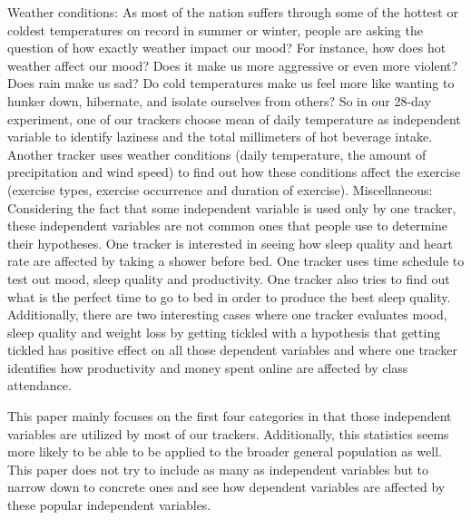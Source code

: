 Weather conditions:
As most of the nation suffers through some of the hottest or coldest temperatures on record in summer or winter, people are asking the question of how exactly weather impact our mood? For instance, how does hot weather affect our mood? Does it make us more aggressive or even more violent? Does rain make us sad? Do cold temperatures make us feel more like wanting to hunker down, hibernate, and isolate ourselves from others? So in our 28-day experiment, one of our trackers choose mean of daily temperature as independent variable to identify laziness and the total millimeters of hot beverage intake. Another tracker uses weather conditions (daily temperature, the amount of precipitation and wind speed) to find out how these conditions affect the exercise (exercise types, exercise occurrence and duration of exercise).
Miscellaneous:
Considering the fact that some independent variable is used only by one tracker, these independent variables are not common ones that people use to determine their hypotheses. One tracker is interested in seeing how sleep quality and heart rate are affected by taking a shower before bed. One tracker uses time schedule to test out mood, sleep quality and productivity. One tracker also tries to find out what is the perfect time to go to bed in order to produce the best sleep quality. Additionally, there are two interesting cases where one tracker evaluates mood, sleep quality and weight loss by getting tickled with a hypothesis that getting tickled has positive effect on all those dependent variables and where one tracker identifies how productivity and money spent online are affected by class attendance. 

This paper mainly focuses on the first four categories in that those independent variables are utilized by most of our trackers. Additionally, this statistics seems more likely to be able to be applied to the broader general population as well. This paper does not try to include as many as independent variables but to narrow down to concrete ones and see how dependent variables are affected by these popular independent variables. 
